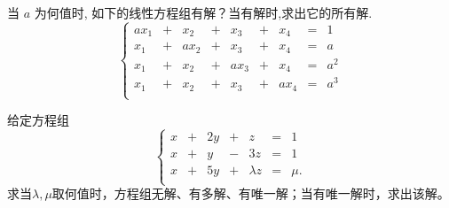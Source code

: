 \begin{frame}

\begin{problem}[2024春期中，大题(12')]
当 $a$ 为何值时, 如下的线性方程组有解？当有解时,求出它的所有解.
\begin{equation*}
\left\{\begin{array}{rcrcrcrcl}
ax_1 &+& x_2 &+& x_3 &+& x_4 &=& 1\\
x_1 &+& ax_2 &+& x_3 &+& x_4 &=& a\\
x_1 &+& x_2 &+& ax_3 &+& x_4 &=& a^2\\
x_1 &+& x_2 &+& x_3 &+& ax_4 &=& a^3\\
\end{array}\right.
\end{equation*}
\end{problem}


\begin{problem}[2024秋期中，大题(10')]
给定方程组
\begin{equation*}
\left\{\begin{array}{rcrcrcrcl}
x &+& 2y &+& z  &=& 1\\
x&+&  y &-& 3z &=& 1\\
x &+& 5y &+& \lambda z  &=& \mu.\\
\end{array}\right.
\end{equation*}
求当$\lambda,\mu$取何值时，方程组无解、有多解、有唯一解；当有唯一解时，求出该解。
\end{problem}


\end{frame}




